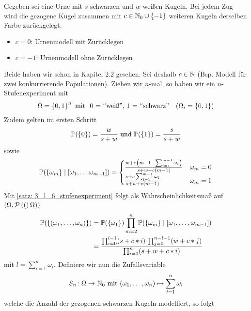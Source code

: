 \begin{beispiel}
	Gegeben sei eine Urne mit $s$ schwarzen und $w$ weißen Kugeln. Bei jedem Zug wird die  gezogene Kugel zusammen mit $c \in \mathbb{N}_0 \cup \left\{ -1 \right\}$ weiteren Kugeln derselben Farbe zurückgelegt.
	\begin{itemize}
		\item $c=0$: Urnenmodell mit Zurücklegen
		\item $c=-1$: Urnenmodell ohne Zurücklegen
	\end{itemize}
	Beide haben wir schon in Kapitel 2.2 gesehen. 
	Sei deshalb $c\in \mathbb{N}$ (Bsp. Modell für zwei konkurrierende Populationen). Ziehen wir $n$-mal, so haben wir ein $n$-Stufenexperiment mit 
	\begin{equation*}
		\Omega = \left\{ 0,1 \right\}^n \text{ mit } \text{ 0 = ``weiß'', 1 = ``schwarz''} \quad (\Omega_i = \left\{ 0,1 \right\})
	\end{equation*}
	Zudem gelten im ersten Schritt
	\begin{equation*}
		\mathbb{P}(\left\{ 0 \right\}) = \frac{w}{s+w} \text{ und } \mathbb{P}(\left\{ 1 \right\}) = \frac{s}{s+w}
	\end{equation*}
	sowie
	\begin{equation*}
		\mathbb{P}(\left\{ \omega_m \right\} \mid [\omega_1, \dots \omega_{m-1}]) = 
		\begin{cases}
		\frac{w+c \left( m-1 - \sum_{i=1}^{m-1}\omega_i \right)}{s+w+c(m-1)} & \omega_m = 0\\
		\frac{s + c\sum_{i=1}^{m-1}\omega_i}{s+w+c(m-1)} & \omega_m = 1
		\end{cases}
	\end{equation*}
	Mit \cref{satz: 3_1_6_stufenexperiment} folgt als Wahrscheinlichkeitsmaß auf $(\Omega, \mathcal{P}\left( ( \right)\Omega))$
	\begin{equation*}
	\begin{aligned}
		\mathbb{P}(\left\{ (\omega_1, \dots, \omega_n) \right\}) 
		&= \mathbb{P}(\left\{ \omega_1 \right\}) \prod_{m=2}^n \mathbb{P}(\left\{ \omega_m \right\}\mid [\omega_1,\dots,\omega_{m-1}]) \\
		&= \frac{\prod_{i=0}^{l-1}(s+c * i) \, \prod_{j=0}^{n-l-1}(w + c * j)}{\prod_{i=0}^n (s+w+c * i)}
	\end{aligned}
	\end{equation*}
	mit $l=\sum_{i=1}^n \omega_i$. Definiere wir nun die Zufallsvariable
	\begin{equation*}
		\abb{S_n}{\Omega}{\N_0} \mit (\omega_1, \dots, \omega_n) \mapsto \sum_{i=1}^n \omega_i
	\end{equation*}
	welche die Anzahl der gezogenen schwarzen Kugeln modelliert, so folgt

\end{beispiel}
